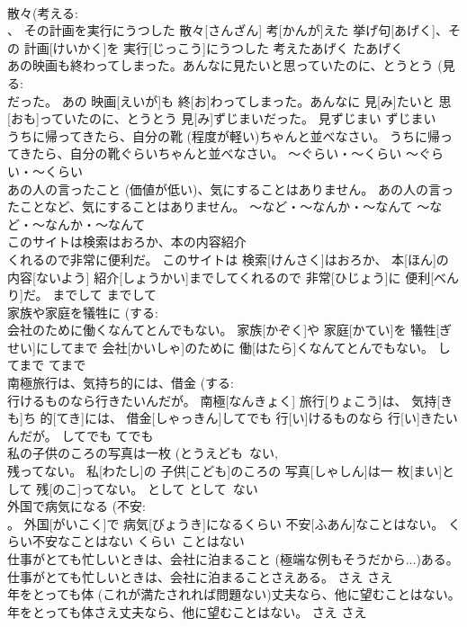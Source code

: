 \documentclass[8pt]{extreport}
\begin{document}
\begin{CJK}{UTF8}{min}
\\	散々(考える: 
\\	、 その計画を実行にうつした	散々[さんざん] 考[かんが]えた 挙げ句[あげく]、その 計画[けいかく]を 実行[じっこう]にうつした	考えたあげく	たあげく	
\\	あの映画も終わってしまった。あんなに見たいと思っていたのに、とうとう (見る: 
\\	だった。	あの 映画[えいが]も 終[お]わってしまった。あんなに 見[み]たいと 思[おも]っていたのに、とうとう 見[み]ずじまいだった。	見ずじまい	ずじまい	
\\	うちに帰ってきたら、自分の靴 (程度が軽い)ちゃんと並べなさい。	うちに帰ってきたら、自分の靴ぐらいちゃんと並べなさい。	～ぐらい・～くらい	～ぐらい・～くらい	
\\	あの人の言ったこと (価値が低い)、気にすることはありません。	あの人の言ったことなど、気にすることはありません。	～など・～なんか・～なんて	～など・～なんか・～なんて	
\\	このサイトは検索はおろか、本の内容紹介 
\\	くれるので非常に便利だ。	このサイトは 検索[けんさく]はおろか、 本[ほん]の 内容[ないよう] 紹介[しょうかい]までしてくれるので 非常[ひじょう]に 便利[べんり]だ。	までして	までして	
\\	家族や家庭を犠牲に (する: 
\\	会社のために働くなんてとんでもない。	家族[かぞく]や 家庭[かてい]を 犠牲[ぎせい]にしてまで 会社[かいしゃ]のために 働[はたら]くなんてとんでもない。	してまで	てまで	
\\	南極旅行は、気持ち的には、借金 (する: 
\\	行けるものなら行きたいんだが。	南極[なんきょく] 旅行[りょこう]は、 気持[きも]ち 的[てき]には、 借金[しゃっきん]してでも 行[い]けるものなら 行[い]きたいんだが。	してでも	てでも	
\\	私の子供のころの写真は一枚 (とうえども~ない, 
\\	残ってない。	私[わたし]の 子供[こども]のころの 写真[しゃしん]は一 枚[まい]として 残[のこ]ってない。	として	として~ない	
\\	外国で病気になる (不安: 
\\	。	外国[がいこく]で 病気[びょうき]になるくらい 不安[ふあん]なことはない。	くらい不安なことはない	くらい~ことはない	
\\	仕事がとても忙しいときは、会社に泊まること (極端な例もそうだから...)ある。	仕事がとても忙しいときは、会社に泊まることさえある。	さえ	さえ	
\\	年をとっても体 (これが満たされれば問題ない)丈夫なら、他に望むことはない。	年をとっても体さえ丈夫なら、他に望むことはない。	さえ	さえ	

\end{CJK}
\end{document}
